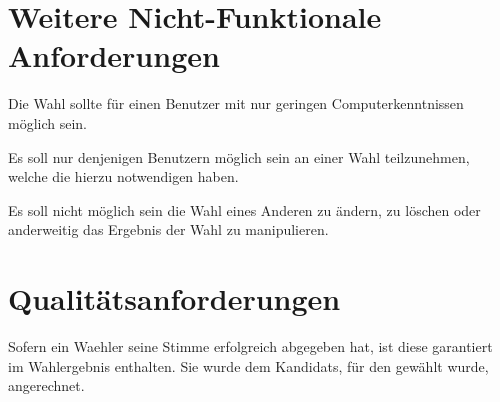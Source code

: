 \documentclass[parskip=full,11pt,twoside]{scrartcl}
\begin{document}
\section{Weitere Nicht-Funktionale Anforderungen}

Die \gls{Wahl} sollte für einen \gls{Benutzer} mit nur geringen Computerkenntnissen möglich sein.

Es soll nur denjenigen Benutzern möglich sein an einer \gls{Wahl} teilzunehmen, welche die hierzu notwendigen  haben.

Es soll nicht möglich sein die \gls{Wahl} eines Anderen zu ändern,  zu löschen oder anderweitig das Ergebnis der \gls{Wahl} zu manipulieren.

\section{Qualitätsanforderungen}
Sofern ein \gls{Waehler} seine \gls{Stimme} erfolgreich abgegeben hat, ist diese garantiert im Wahlergebnis enthalten. Sie wurde dem \glspl{Kandidat}, für den gewählt wurde, angerechnet.

\pagebreak
\end{document}
